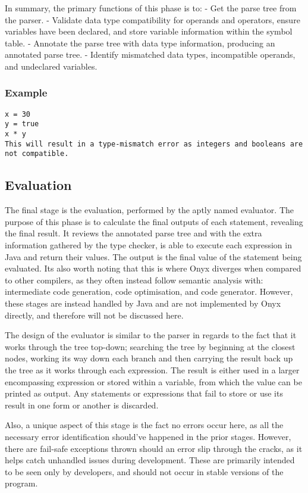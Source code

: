 \documentclass[
]{report}
\begin{document}
In summary, the primary functions of this phase is to: - Get the parse
tree from the parser. - Validate data type compatibility for operands
and operators, ensure variables have been declared, and store variable
information within the symbol table. - Annotate the parse tree with data
type information, producing an annotated parse tree. - Identify
mismatched data types, incompatible operands, and undeclared variables.

\subsubsection{Example}
\begin{verbatim}
x = 30
y = true
x * y
This will result in a type-mismatch error as integers and booleans are not compatible.
\end{verbatim}

\subsection{Evaluation}
The final stage is the evaluation, performed by the aptly named
evaluator. The purpose of this phase is to calculate the final outputs
of each statement, revealing the final result. It reviews the annotated
parse tree and with the extra information gathered by the type checker,
is able to execute each expression in Java and return their values. The
output is the final value of the statement being evaluated. Its also
worth noting that this is where Onyx diverges when compared to other
compilers, as they often instead follow semantic analysis with:
intermediate code generation, code optimisation, and code generator.
However, these stages are instead handled by Java and are not
implemented by Onyx directly, and therefore will not be discussed here.

The design of the evaluator is similar to the parser in regards to the
fact that it works through the tree top-down; searching the tree by
beginning at the closest nodes, working its way down each branch and
then carrying the result back up the tree as it works through each
expression. The result is either used in a larger encompassing
expression or stored within a variable, from which the value can be
printed as output. Any statements or expressions that fail to store or
use its result in one form or another is discarded.

Also, a unique aspect of this stage is the fact no errors occur here, as
all the necessary error identification should've happened in the prior
stages. However, there are fail-safe exceptions thrown should an error
slip through the cracks, as it helps catch unhandled issues during
development. These are primarily intended to be seen only by developers,
and should not occur in stable versions of the program.
\end{document}
